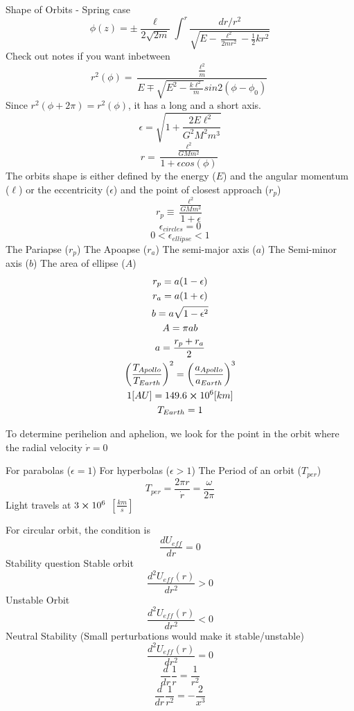 \documentclass[12pt]{article}
\begin{document}
    Shape of Orbits - Spring case
    \[
        \phi(z) = \pm \frac{\ell}{2 \sqrt{2 m}} \int^r \frac{dr / r^2}{\sqrt{E - \frac{\ell^2}{2 m r^2} - \frac{1}{2}k r^2}}
    \]
    Check out notes if you want inbetween
    \[
        r^2(\phi) = \frac{\frac{\ell^2}{m}}{E \mp \sqrt{E^2 - \frac{k \ell^2}{m}} sin2(\phi-\phi_0)}
    \]
    Since $r^2(\phi + 2\pi) = r^2(\phi)$, it has a long and a short axis. 
    \[
        \epsilon = \sqrt{1 + \frac{2 E \ell^2}{G^2 M^2 m^3}}
    \]
    \[
        r = \frac{\frac{\ell^2}{G M m^2}}{1 + \epsilon cos(\phi)}
    \]
    The orbits shape is either defined by the energy ($E$) and the angular momentum ($\ell$) or the eccentricity ($\epsilon$) and the point of closest approach ($r_p$)
    \[
        r_p \equiv \frac{\frac{\ell^2}{G M m^2}}{1 + \epsilon}
    \]
    \[
        \epsilon_{circles} = 0
    \]
    \[
        0 < \epsilon_{ellipse} < 1
    \]
    The Pariapse ($r_p$)
    The Apoapse ($r_a$)
    The semi-major axis ($a$)
    The Semi-minor axis ($b$)
    The area of ellipse ($A$)
    \begin{gather*}
        r_p = a(1-\epsilon)
        \\ r_a = a(1+\epsilon)
        \\ b = a \sqrt{1 - \epsilon^2}
        \\ A = \pi a b
        \\ a = \frac{r_p + r_a}{2}
        \\ \left(\frac{T_{Apollo}}{T_{Earth}} \right)^2 = \left(\frac{a_{Apollo}}{a_{Earth}} \right)^3
        \\ 1 [AU] = 149.6 \cross 10^6 [km]
        \\ T_{Earth} = 1
    \end{gather*}

    To determine perihelion and aphelion, we look for the point in the orbit where the radial velocity $\dot{r}=0$
    
    
    For parabolas ($\epsilon = 1$)
    For hyperbolas ($\epsilon > 1$)
    The Period of an orbit ($T_{per}$)
    \[
    T_{per} = \frac{2 \pi r}{\dot{r}} = \frac{\omega}{2 \pi}
    \]
    Light travels at $3 \cross 10^6$ $[\frac{km}{s}]$ 

    For circular orbit, the condition is 
    \[
        \frac{d U_{eff}}{dr} = 0
    \]
    Stability question
    Stable orbit
    \[
        \frac{d^2 U_{eff}(r)}{dr^2} > 0
    \]
    Unstable Orbit
    \[
        \frac{d^2 U_{eff}(r)}{dr^2} < 0
    \]
    Neutral Stability (Small perturbations would make it stable/unstable)
    \[
        \frac{d^2 U_{eff}(r)}{dr^2} = 0
    \]
    \[
        \frac{d}{dr} \frac{1}{r} = \frac{1}{r^2}
    \]
    \[
        \frac{d}{dr} \frac{1}{r^2} = - \frac{2}{x^3}
    \]
\end{document}
